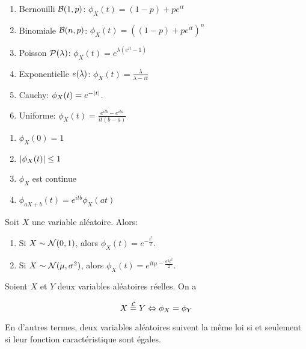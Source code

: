\begin{exemple}
	\begin{enumerate}
		\item Bernouilli $\mathcal{B}(1, p)$: $\phi_{X}(t) = (1 - p) + p e^{it}$
		\item Binomiale $\mathcal{B}(n, p)$: $\phi_{X}(t) = ( (1 - p) + p e^{it})^{n}$
		\item Poisson $\mathcal{P}(\lambda)$: $\phi_{X}(t) = e^{\lambda (e^{it} - 1)}$
		\item Exponentielle $e(\lambda)$: $\phi_{X}(t) = \frac{\lambda}{\lambda
			- it}$
		\item Cauchy: $\phi_{X}(t) = e^{-\abs{t}}$.
		\item Uniforme: $\phi_{X}(t) = \frac{e^{itb} - e^{ita}}{it (b - a)}$
	\end{enumerate}
\end{exemple}

\begin{proposition}
	\begin{enumerate}
		\item $\phi_{X}(0) = 1$
		\item $\abs{\phi_{X}(t)} \leq 1$
		\item $\phi_{X}$ est continue
		\item $\phi_{aX + b}(t) = e^{itb} \phi_{X}(at)$
	\end{enumerate}
\end{proposition}

\begin{theorem}
	Soit $X$ une variable aléatoire. Alors:

	\begin{enumerate}
		\item Si $X \sim \mathcal{N}(0, 1)$, alors $\phi_{X}(t) =
			e^{-\frac{t^{2}}{2}}$.
		\item Si $X \sim \mathcal{N}(\mu, \sigma^{2})$, alors $\phi_{X}(t)
			= e^{it \mu - \frac{\sigma^{2}t^{2}}{2}}$.
	\end{enumerate}
\end{theorem}

\begin{theorem}
	Soient $X$ et $Y$ deux variables aléatoires réelles. On a

	\begin{equation}
		X \overset{\mathcal{L}}{=} Y \Leftrightarrow \phi_{X} = \phi_{Y}
	\end{equation}

	En d'autres termes, deux variables aléatoires suivent la même loi si et
	seulement si leur fonction caractéristique sont égales.
\end{theorem}

